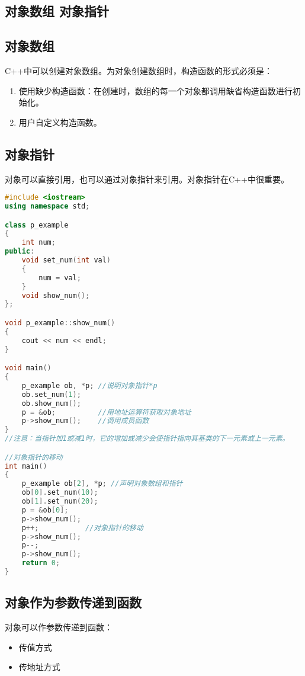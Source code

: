 \documentclass{article}
\begin{document}
\begin{CJK}{UTF8}{gbsn}
\section{对象数组 对象指针}
\subsection{对象数组}
C++中可以创建对象数组。为对象创建数组时，构造函数的形式必须是：
\begin{enumerate}
  \itemsep=-3pt
\item 使用缺少构造函数：在创建时，数组的每一个对象都调用缺省构造函数进行初始化。
\item 用户自定义构造函数。
\end{enumerate}

\subsection{对象指针}
对象可以直接引用，也可以通过对象指针来引用。对象指针在C++中很重要。
\begin{lstlisting}[language=c++]
#include <iostream>
using namespace std;

class p_example 
{
    int num;
public:
    void set_num(int val) 
    {
        num = val;
    }
    void show_num();
};

void p_example::show_num() 
{
    cout << num << endl;
}

void main() 
{
    p_example ob, *p; //说明对象指针*p
    ob.set_num(1);    
    ob.show_num();
    p = &ob;          //用地址运算符获取对象地址
    p->show_num();    //调用成员函数
}
//注意：当指针加1或减1时，它的增加或减少会使指针指向其基类的下一元素或上一元素。

//对象指针的移动 
int main() 
{
    p_example ob[2], *p; //声明对象数组和指针
    ob[0].set_num(10);
    ob[1].set_num(20);
    p = &ob[0];
    p->show_num();
    p++;           //对象指针的移动
    p->show_num();
    p--;
    p->show_num();
    return 0;
}
\end{lstlisting}

\subsection{对象作为参数传递到函数}
对象可以作参数传递到函数：
\begin{itemize}
  \itemsep=-3pt
\item 传值方式
\item 传地址方式
\end{itemize}


\end{CJK}
\end{document}
